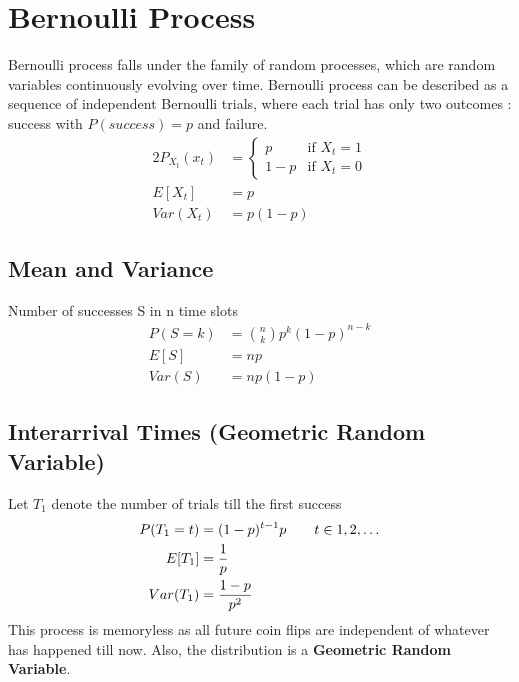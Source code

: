 \documentclass[../probability-notes.tex]{subfiles}
\begin{document}
    \section{Bernoulli Process}
    Bernoulli process falls under the family of random processes, which are random variables continuously evolving over time. Bernoulli process can be described as a sequence of independent Bernoulli trials, where each trial has only two outcomes : success with $P(success) = p$ and failure.
    \begin{alignat*}{2}
        P_{X_{t}}(x_{t}) &= \begin{cases} p &\mbox{if $X_{t} = 1$}\\
                                        1-p &\mbox{if $X_{t} = 0$} \end{cases}\\
        E[X_{t}] &= p\\
        Var(X_{t}) &= p(1-p)
    \end{alignat*}

    \subsection{Mean and Variance}
    Number of successes S in n time slots
    \begin{align*}
        P(S=k) &= \binom{n}{k} p^{k}(1-p)^{n-k}\\
        E[S] &= np\\
        Var(S) &= np(1-p)
    \end{align*}

    \subsection{Interarrival Times (Geometric Random Variable)}
    Let $T_{1}$ denote the number of trials till the first success
    \begin{align*}
        P(T_{1} = t) &= (1-p)^{t-1}p \tag*{$t \in {1, 2, \ldots}$}\\
        E[T_{1}] &= \frac{1}{p}\\
        Var(T_{1}) &= \frac{1-p}{p^{2}}
    \end{align*}
    This process is memoryless as all future coin flips are independent of whatever has happened till now. Also, the distribution is a \textbf{Geometric Random Variable}.
\end{document}
